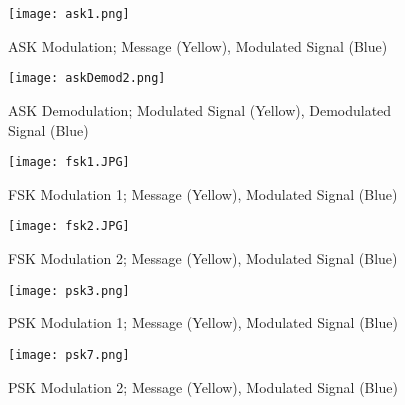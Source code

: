 \begin{figure}[H]
    \centering
    \begin{minipage}{0.45\linewidth}
        \centering
        \texttt{[image: ask1.png]}
        \caption{ASK Modulation; Message (Yellow), Modulated Signal (Blue)}
        \label{fig:ask_mod}
    \end{minipage}
    \hfill
    \begin{minipage}{0.45\linewidth}
        \centering
        \texttt{[image: askDemod2.png]}
        \caption{ASK Demodulation; Modulated Signal (Yellow), Demodulated Signal (Blue)}
        \label{fig:ask_demod}
    \end{minipage}
    \vspace{1em}
    \begin{minipage}{0.45\linewidth}
        \centering
        \texttt{[image: fsk1.JPG]}
        \caption{FSK Modulation 1; Message (Yellow), Modulated Signal (Blue)}
        \label{fig:fsk_mod1}
    \end{minipage}
    \hfill
    \begin{minipage}{0.45\linewidth}
        \centering
        \texttt{[image: fsk2.JPG]}
        \caption{FSK Modulation 2; Message (Yellow), Modulated Signal (Blue)}
        \label{fig:fsk_mod2}
    \end{minipage}
    \vspace{1em}
    \begin{minipage}{0.45\linewidth}
        \centering
        \texttt{[image: psk3.png]}
        \caption{PSK Modulation 1; Message (Yellow), Modulated Signal (Blue)}
        \label{fig:psk_mod1}
    \end{minipage}
    \hfill
    \begin{minipage}{0.45\linewidth}
        \centering
        \texttt{[image: psk7.png]}
        \caption{PSK Modulation 2; Message (Yellow), Modulated Signal (Blue)}
        \label{fig:psk_mod2}
    \end{minipage}
\end{figure}
